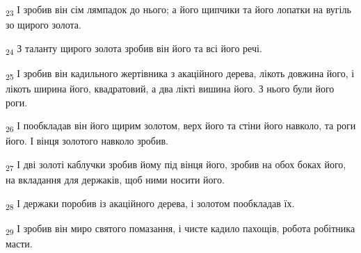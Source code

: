 \begin{tcolorbox}
\textsubscript{23} І зробив він сім лямпадок до нього; а його щипчики та його лопатки на вугіль зо щирого золота.
\end{tcolorbox}
\begin{tcolorbox}
\textsubscript{24} З таланту щирого золота зробив він його та всі його речі.
\end{tcolorbox}
\begin{tcolorbox}
\textsubscript{25} І зробив він кадильного жертівника з акаційного дерева, лікоть довжина його, і лікоть ширина його, квадратовий, а два лікті вишина його. З нього були його роги.
\end{tcolorbox}
\begin{tcolorbox}
\textsubscript{26} І пообкладав він його щирим золотом, верх його та стіни його навколо, та роги його. І вінця золотого навколо зробив.
\end{tcolorbox}
\begin{tcolorbox}
\textsubscript{27} І дві золоті каблучки зробив йому під вінця його, зробив на обох боках його, на вкладання для держаків, щоб ними носити його.
\end{tcolorbox}
\begin{tcolorbox}
\textsubscript{28} І держаки поробив із акаційного дерева, і золотом пообкладав їх.
\end{tcolorbox}
\begin{tcolorbox}
\textsubscript{29} І зробив він миро святого помазання, і чисте кадило пахощів, робота робітника масти.
\end{tcolorbox}
